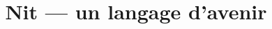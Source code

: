 \documentclass{beamer}
\title{Nit --- un langage d'avenir}
\date{}
\begin{document}
\frame{\titlepage}

\frame{\tableofcontents}


\end{document}
